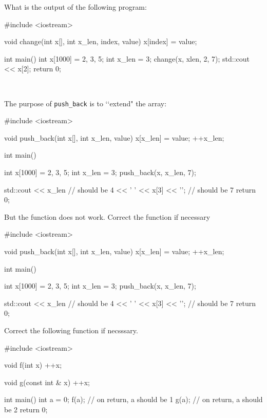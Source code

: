 

\nextq
What is the output of the following program:
\begin{console}[fontsize=\footnotesize]
#include <iostream>

void change(int x[], int x_len, index, value)
{
    x[index] = value;
}

int main()
{
    int x[1000] = {2, 3, 5};
    int x_len = 3;
    change(x, xlen, 2, 7);
    std::cout << x[2];
    return 0;
}
\end{console}
\\
\ANSWER
\begin{answercode}

\end{answercode}

\nextq
The purpose of \verb!push_back! is to \lq\lq extend" the array:
\begin{console}[fontsize=\footnotesize]
#include <iostream>

void push_back(int x[], int x_len, value)
{
    x[x_len] = value;
    ++x_len;
}

int main()
{
    int x[1000] = {2, 3, 5};
    int x_len = 3;
    push_back(x, x_len, 7);

    std::cout << x_len           // should be 4
              << ' '
              << x[3] << '\n';   // should be 7
    return 0;
}
\end{console}
But the function does not work.
Correct the function if necessary
\\
\ANSWER
\begin{answercode}
#include <iostream>

void push_back(int x[], int x_len, value)
{
    x[x_len] = value;
    ++x_len;
}

int main()
{
    int x[1000] = {2, 3, 5};
    int x_len = 3;
    push_back(x, x_len, 7);

    std::cout << x_len           // should be 4
              << ' '
              << x[3] << '\n';   // should be 7
    return 0;
}
\end{answercode}

\nextq
Correct the following function if necsssary.
\\
\ANSWER
\begin{answercode}
#include <iostream>

void f(int x)
{
    ++x;
}

void g(const int & x)
{
    ++x;
}

int main()
{
    int a = 0;
    f(a);      // on return, a should be 1
    g(a);      // on return, a should be 2
    return 0;
}
\end{answercode}

